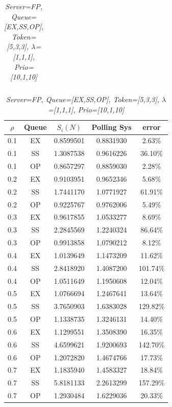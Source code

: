 \documentclass[12pt,a4paper,italian]{article}
\begin{document}
\begin{table}[ht!]
\begin{minipage}[b]{0.48\linewidth}
\begin{tabular}{c c c c c}
			
		\end{tabular}
	\end{minipage}
	\hspace{0.5cm}
	\begin{minipage}[b]{0.48\linewidth}
		\centering
		\caption{\scriptsize \emph{Server=FP, Queue=[EX,SS,OP], Token=[5,3,3], $\lambda$=[1,1,1], Prio=[10,1,10]}}
		\label{tab16}
		\tiny
		\begin{tabular}{c c c c c}
			\hline
			$\rho$ & Queue & $S_i(N)$ & Polling Sys & error \\ \hline
			 0.1 & EX & 0.8599501 &   0.8831930    &  2.63\%  \\
			 0.1 & SS & 1.3087538 &   0.9616226    & 36.10\%  \\
			 0.1 & OP & 0.8657297 &   0.8859030    &  2.28\%  \\ \hline \hline
			 0.2 & EX & 0.9103951 &   0.9652346    &  5.68\%  \\
			 0.2 & SS & 1.7441170 &   1.0771927    & 61.91\%  \\
			 0.2 & OP & 0.9225767 &   0.9762006    &  5.49\%  \\ \hline \hline
			 0.3 & EX & 0.9617855 &   1.0533277    &  8.69\%  \\
			 0.3 & SS & 2.2845569 &   1.2240324    & 86.64\%  \\
			 0.3 & OP & 0.9913858 &   1.0790212    &  8.12\%  \\ \hline \hline
			 0.4 & EX & 1.0139649 &   1.1473209    & 11.62\%  \\
			 0.4 & SS & 2.8418920 &   1.4087200    & 101.74\% \\
			 0.4 & OP & 1.0511649 &   1.1950608    & 12.04\%  \\ \hline \hline
			 0.5 & EX & 1.0766694 &   1.2467641    & 13.64\%  \\
			 0.5 & SS & 3.7650903 &   1.6383028    & 129.82\% \\
			 0.5 & OP & 1.1338735 &   1.3246131    & 14.40\%  \\ \hline \hline
			 0.6 & EX & 1.1299551 &   1.3508390    & 16.35\%  \\
			 0.6 & SS & 4.6599621 &   1.9200693    & 142.70\% \\
			 0.6 & OP & 1.2072820 &   1.4674766    & 17.73\%  \\ \hline \hline
			 0.7 & EX & 1.1835940 &   1.4583327    & 18.84\%  \\
			 0.7 & SS & 5.8181133 &   2.2613299    & 157.29\% \\
			 0.7 & OP & 1.2930484 &   1.6229036    & 20.33\%  \\ \hline \hline

\end{tabular}
\end{minipage}
\end{table}
\end{document}

